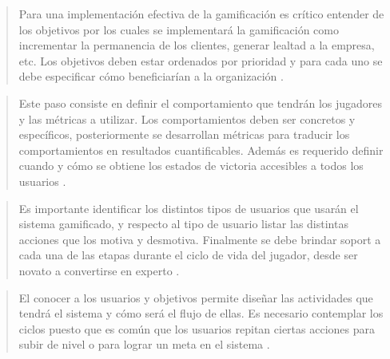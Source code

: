 
    \begin{quote}
        Para una implementación efectiva de la gamificación es crítico entender de los
        objetivos por los cuales se implementará la gamificación como incrementar la
        permanencia de los clientes, generar lealtad a la empresa, etc. Los objetivos
        deben estar ordenados por prioridad y para cada uno se debe especificar cómo
        beneficiarían a la organización \cite[p. 62]{ForTheWin}.
    \end{quote}



    \begin{quote}
        Este paso consiste en definir el comportamiento que tendrán los jugadores y las
        métricas a utilizar. Los comportamientos deben ser concretos y específicos,
        posteriormente se desarrollan métricas para traducir los comportamientos en
        resultados cuantificables. Además es requerido definir cuando y cómo se obtiene
        los estados de victoria accesibles a todos los usuarios \cite[pp. 63-64]{ForTheWin}.
    \end{quote}



    \begin{quote}
        Es importante identificar los distintos tipos de usuarios que usarán el sistema
        gamificado, y respecto al tipo de usuario listar las distintas acciones que los
        motiva y desmotiva. Finalmente se debe brindar soport a cada una de las etapas durante
        el ciclo de vida del jugador, desde ser novato a convertirse en experto
        \cite[pp. 64-65]{ForTheWin}.
    \end{quote}



    \begin{quote}
        El conocer a los usuarios y objetivos permite diseñar las actividades que tendrá
        el sistema y cómo será el flujo de ellas. Es necesario contemplar los ciclos puesto
        que es común que los usuarios repitan ciertas acciones para subir de nivel o para
        lograr un meta en el sistema \cite[p. 66]{ForTheWin}.
    \end{quote}


